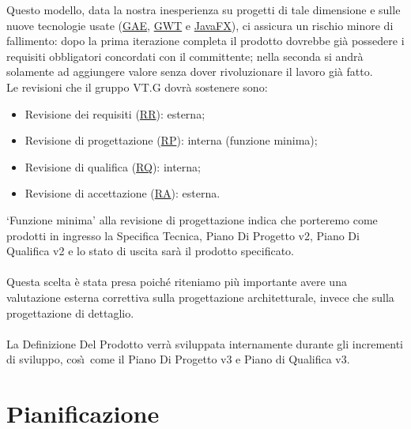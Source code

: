 Questo modello, data la nostra inesperienza su progetti di tale dimensione e
sulle nuove tecnologie usate (\underline{GAE}, \underline{GWT} e
\underline{JavaFX}), ci assicura un rischio minore di fallimento: dopo la prima iterazione completa il prodotto dovrebbe
gi\`a possedere i requisiti obbligatori concordati con il committente; nella
seconda si andr\`a solamente ad aggiungere valore senza dover rivoluzionare il
lavoro gi\`a fatto.\\

Le revisioni che il gruppo VT.G dovr\`a sostenere sono:
\begin{itemize}
  \item Revisione dei requisiti (\underline{RR}): esterna;
  \item Revisione di progettazione (\underline{RP}): interna (funzione minima);
  \item Revisione di qualifica (\underline{RQ}): interna;
  \item Revisione di accettazione (\underline{RA}): esterna.
\end{itemize} \vspace{0.5cm}

`Funzione minima' alla revisione di progettazione indica che porteremo come
prodotti in ingresso la Specifica Tecnica, Piano Di Progetto v2, Piano Di
Qualifica v2 e lo stato di uscita sar\`a il prodotto specificato.\\
\\
Questa scelta \`e stata presa poich\'e riteniamo pi\`u importante avere una
valutazione esterna correttiva sulla progettazione architetturale, invece che
sulla progettazione di dettaglio.\\
\\
La Definizione Del Prodotto verr\`a sviluppata internamente durante gli
incrementi di sviluppo, cos\`\i\ come il Piano Di Progetto v3 e Piano di
Qualifica v3.


\chapter{Pianificazione}
\thispagestyle{fancy}

